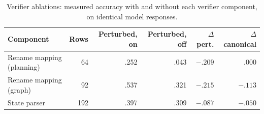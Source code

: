 \begin{table}[t]
\centering
\caption{Verifier ablations: measured accuracy with and without each verifier
component, on identical model responses.}
\label{tab:oracle}
\small
\begin{tabular}{lrrrrr}
\toprule
Component & Rows & Perturbed, on & Perturbed, off & $\Delta$ pert. & $\Delta$ canonical \\
\midrule
Rename mapping (planning) & 64 & .252 & .043 & $-.209$ & $.000$ \\
Rename mapping (graph) & 92 & .537 & .321 & $-.215$ & $-.113$ \\
State parser & 192 & .397 & .309 & $-.087$ & $-.050$ \\
\bottomrule
\end{tabular}
\end{table}
